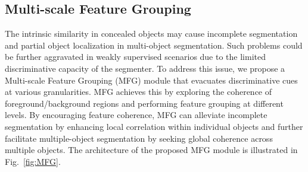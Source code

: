 \subsection{Multi-scale Feature Grouping}
\label{Sec:MFG}
The intrinsic similarity in concealed objects may cause incomplete segmentation and partial object localization in multi-object segmentation. Such problems could be further aggravated in weakly supervised scenarios due to the limited discriminative capacity of the segmenter. To address this issue, we propose a Multi-scale Feature Grouping (MFG) module that evacuates discriminative cues at various granularities. MFG achieves this by exploring the coherence of foreground/background regions and performing feature grouping at different levels. By encouraging feature coherence, MFG can alleviate incomplete segmentation by enhancing local correlation within individual objects and further facilitate multiple-object segmentation by seeking global coherence across multiple objects. 
The architecture of the proposed MFG module is illustrated in Fig.~\ref{fig:MFG}. 

